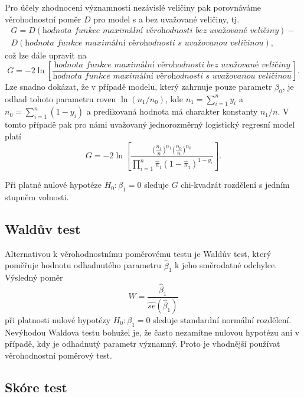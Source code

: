 Pro účely zhodnocení významnosti nezávislé veličiny pak porovnáváme věrohodnostní poměr $D$ pro model s a bez uvažované veličiny, tj.
\begin{multline}
G = D(\textit{hodnota funkce maximální věrohodnosti bez uvažované veličiny}) - \\
D(\textit{hodnota funkce maximální věrohodnosti s uvažovanou veličinou}),
\end{multline}
což lze dále upravit na
\begin{equation}
G = -2 \ln \left[\frac{\textit{hodnota funkce maximální věrohodnosti bez uvažované veličiny}}{\textit{hodnota funkce maximální věrohodnosti s uvažovanou veličinou}}\right].
\end{equation}
Lze snadno dokázat, že v případě modelu, který zahrnuje pouze parametr $\beta_0$, je odhad tohoto parametru roven $\ln(n_1 / n_0)$, kde $n_1 = \sum_{i = 1}^n y_i$ a $n_0 = \sum_{i = 1}^n (1 - y_i)$ a predikovaná hodnota má charakter konstanty $n_1 / n$. V tomto případě pak pro námi uvažovaný jednorozměrný logistický regresní model platí
\begin{equation}
G = -2 \ln \left[\frac{\Big(\frac{n_1}{n}\Big)^{n_1}\Big(\frac{n_0}{n}\Big)^{n_0}}{\prod_{i = 1}^n \hat{\pi}_i (1 - \hat{\pi}_i)^{1 - y_i}}\right].
\end{equation}

Při platné nulové hypotéze $H_0: \beta_1 = 0$ sleduje $G$ chi-kvadrát rozdělení s jedním stupněm volnosti.

\subsection{Waldův test}

Alternativou k věrohodnostnímu poměrovému testu je Waldův test, který poměřuje hodnotu odhadnutého parametru $\hat{\beta}_1$ k jeho směrodatné odchylce. Výsledný poměr
\begin{equation}
W = \frac{\hat{\beta}_1}{\widehat{se}(\hat{\beta}_1)}
\end{equation}
při platnosti nulové hypotézy $H_0: \beta_1 = 0$ sleduje standardní normální rozdělení. Nevýhodou Waldova testu bohužel je, že často nezamítne nulovou hypotézu ani v případě, kdy je odhadnutý parametr významný. Proto je vhodnější používat věrohodnostní poměrový test.

\subsection{Skóre test}

